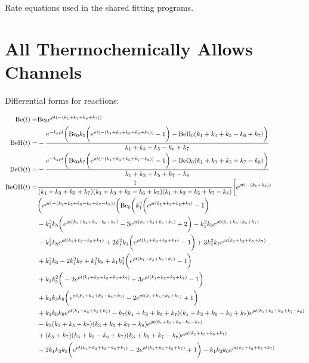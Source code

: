 Rate equations used in the shared fitting programs.

\section{ All Thermochemically Allows Channels}

Differential forms for reactions:

\begin{align*}
	\ce{Be}(t) = & \ce{Be0} e^{\rho t (-(k_1+k_3+k_5+k_7))} \\
	\ce{BeH}(t) = & -\frac{e^{-k_6 \rho t} \bigg(\ce{Be0} k_5 \bigg(e^{\rho t (-(k_1+k_3+k_5-k_6+k_7))}-1\bigg)-\ce{BeH0} (k_1+k_3+k_5-k_6+k_7)\bigg)}{k_1+k_3+k_5-k_6+k_7} \\
	\ce{BeO}(t) = & -\frac{e^{-k_8 \rho t} \bigg(\ce{Be0} k_7 \bigg(e^{\rho t (-(k_1+k_3+k_5+k_7-k_8))}-1\bigg)-\ce{BeO0} (k_1+k_3+k_5+k_7-k_8)\bigg)}{k_1+k_3+k_5+k_7-k_8} \\
	\ce{BeOH}(t) = & \frac{1}{(k_1+k_3+k_5+k_7) (k_1+k_3+k_5-k_6+k_7) (k_1+k_3+k_5+k_7-k_8)} \bigg[e^{\rho t (-(k_6+k_8))} \\
	& \bigg(e^{\rho t (-(k_1+k_3+k_5-k_6+k_7-k_8))} \bigg(\ce{Be0} \bigg(k_1^3 \bigg(e^{\rho t (k_1+k_3+k_5+k_7)}-1\bigg) \\
	& -k_1^2 k_5\bigg(e^{\rho t (k_1+k_3+k_5-k_6+k_7)}-3 e^{\rho t (k_1+k_3+k_5+k_7)}+2\bigg)-k_1^2 k_6 e^{\rho t (k_1+k_3+k_5+k_7)} \\
	& -k_1^2 k_8 e^{\rho t (k_1+k_3+k_5+k_7)}+2 k_1^2 k_3 \bigg(e^{\rho t (k_1+k_3+k_5+k_7)}-1\bigg)+3 k_1^2 k_7 e^{\rho t (k_1+k_3+k_5+k_7)} \\
	& +k_1^2 k_6-2 k_1^2 k_7+k_1^2 k_8+k_1 k_3^2 \bigg(e^{\rho t (k_1+k_3+k_5+k_7)}-1\bigg) \\
	& +k_1 k_5^2 \bigg(-2 e^{\rho t (k_1+k_3+k_5-k_6+k_7)}+3 e^{\rho t (k_1+k_3+k_5+k_7)}-1\bigg) \\
	& +k_1 k_5 k_8 \bigg(e^{\rho t (k_1+k_3+k_5-k_6+k_7)}-2 e^{\rho t (k_1+k_3+k_5+k_7)}+1\bigg) \\
	& +k_1 k_6 k_8 e^{\rho t (k_1+k_3+k_5+k_7)}-k_7 (k_1+k_3+k_5+k_7) (k_1+k_3+k_5-k_6+k_7) e^{\rho t (k_1+k_3+k_5+k_7-k_8)} \\
	& -k_5 (k_3+k_5+k_7) (k_3+k_5+k_7-k_8) e^{\rho t (k_1+k_3+k_5-k_6+k_7)} \\
	& +(k_5+k_7) (k_3+k_5-k_6+k_7) (k_3+k_5+k_7-k_8) e^{\rho t (k_1+k_3+k_5+k_7)} \\
	& -2 k_1 k_3 k_5 \bigg(e^{\rho t (k_1+k_3+k_5-k_6+k_7)}-2 e^{\rho t (k_1+k_3+k_5+k_7)}+1\bigg)-k_1 k_3 k_6 e^{\rho t (k_1+k_3+k_5+k_7)}\\

\end{align*}
